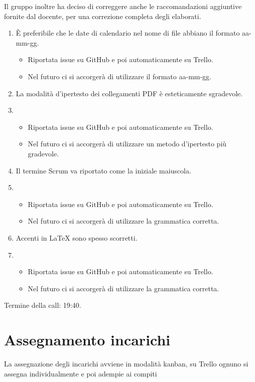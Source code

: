 Il gruppo inoltre ha deciso di correggere anche le raccomandazioni aggiuntive fornite dal docente, per
una correzione completa degli elaborati.
\begin{enumerate}
	\item È preferibile che le date di calendario nel nome di file abbiano il formato aa-mm-gg.
	\begin{itemize}
		\item Riportata issue su GitHub e poi automaticamente su Trello.
		\item Nel futuro ci si accorgerà di utilizzare il formato aa-mm-gg.
	\end{itemize}
	\item La modalità d'ipertesto dei collegamenti PDF è esteticamente sgradevole.
	\item \begin{itemize}
		\item Riportata issue su GitHub e poi automaticamente su Trello.
		\item Nel futuro ci si accorgerà di utilizzare un metodo d'ipertesto più gradevole.
	\end{itemize}
	\item Il termine Scrum va riportato come la iniziale maiuscola.
	\item \begin{itemize}
		\item Riportata issue su GitHub e poi automaticamente su Trello.
		\item Nel futuro ci si accorgerà di utilizzare la grammatica corretta.
	\end{itemize}
	\item Accenti in LaTeX sono spesso scorretti.
	\item \begin{itemize}
		\item Riportata issue su GitHub e poi automaticamente su Trello.
		\item Nel futuro ci si accorgerà di utilizzare la grammatica corretta.
	\end{itemize}
\end{enumerate}

\noindent Termine della call: 19:40.

\section{Assegnamento incarichi}
La assegnazione degli incarichi avviene in modalità kanban, su Trello ognuno si assegna individualmente e poi adempie ai compiti 
